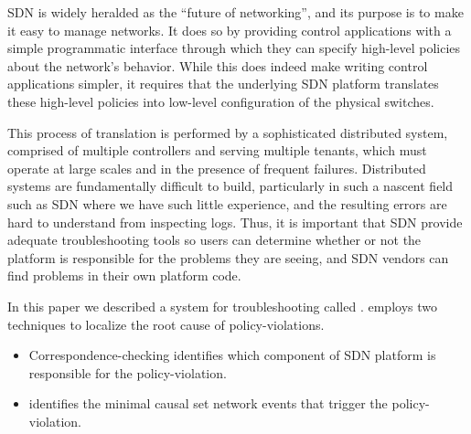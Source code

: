 
SDN is widely heralded as the ``future of networking'', and its purpose is to make it easy to manage networks.  It does so by providing control applications with a simple programmatic interface through which they can specify high-level policies about the network's behavior. While this does indeed make writing control applications simpler, it requires that the underlying SDN platform translates these high-level policies into low-level configuration of the physical switches.

This process of translation is performed by a sophisticated distributed system, comprised of multiple controllers and serving multiple tenants, which must operate at large scales and in the presence of frequent failures. Distributed systems are fundamentally difficult to build, particularly in such a nascent field such as SDN where we have such little experience, and the resulting errors are hard to understand from inspecting logs. Thus, it is important that SDN provide adequate troubleshooting tools so users can determine whether or not the platform is responsible for the problems they are seeing, and SDN vendors can find problems in their own platform code.

In this paper we described a system for troubleshooting called \projectname{}. \projectname{} employs two techniques to localize the root cause of policy-violations.\begin{itemize}
    \item Correspondence-checking identifies which component of SDN platform is responsible for the policy-violation.
    \item  \Simulator{} identifies the minimal causal set network events that trigger the policy-violation.
\end{itemize}

